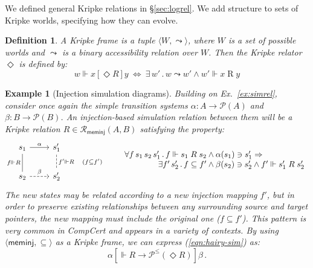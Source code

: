 \documentclass[draft,11pt]{report}
\newtheorem{definition}{Definition}
\newtheorem{example}{Example}
\newcommand{\kw}[1]{\ensuremath{ \mathsf{#1} }}
\newcommand{\ifr}[1]{\mathrel{[{#1}]}}
\begin{document}
We defined general Kripke relations in \S\ref{sec:logrel}.
We add structure to sets of Kripke worlds,
specifying how they can evolve.

\begin{definition} %
A \emph{Kripke frame} is a tuple
$\langle W, {\leadsto} \rangle$, where
$W$ is a set of \emph{possible worlds} and
$\leadsto$ is a
binary \emph{accessibility relation} over $W$.
Then the Kripke relator $\Diamond$ is defined by:
\[
  w \Vdash x \ifr{\Diamond R} y \: \Leftrightarrow \:
    \exists \, w' \,.\, w \leadsto w' \wedge
      w' \Vdash x \mathrel{R} y
\]
\end{definition}

\begin{example}[Injection simulation diagrams] \label{ex:sim} %
Building on Ex.~\ref{ex:simrel},
consider once again the simple transition systems
$\alpha : A \rightarrow \mathcal{P}(A)$ and
$\beta : B \rightarrow \mathcal{P}(B)$.
An injection-based simulation relation between them
will be a Kripke relation
$R \in \mathcal{R}_\kw{meminj}(A, B)$
satisfying the property:
\begin{equation}
    \label{eqn:hairy-sim}
  \begin{tikzcd}[scale=0.8]
    s_1 \arrow[r, "\alpha"]
        \arrow[d, dash, "f \Vdash R"'] &
    s_1' \arrow[d, dashed, dash, "f' \Vdash R \quad (f \subseteq f')"] \\
    s_2 \arrow[r, dashed, "\beta"] &
    s_2'
  \end{tikzcd}
  \qquad
    \begin{array}{r@{}l}
    \forall f \, s_1 \, s_2 \, s_1' \,.\,
      f \Vdash s_1 \mathrel{R} s_2 &{} \wedge
      \alpha(s_1) \ni s_1' \Rightarrow \\
    \exists f' \, s_2' \,.\,
      f \subseteq f' &{} \wedge
      \beta(s_2) \ni s_2' \wedge
      f' \Vdash s_1' \mathrel{R} s_2'
    \end{array}
\end{equation}
The new states may be related according to
a new injection mapping $f'$,
but in order to preserve existing relationships
between any surrounding source and target pointers,
the new mapping must include
the original one ($f \subseteq f'$).
This pattern is very common in CompCert
and appears in a variety of contexts.
By using $\langle \kw{meminj}, {\subseteq} \rangle$
as a Kripke frame,
we can express
(\ref{eqn:hairy-sim}) as:
\[
  \alpha \ifr{\Vdash R \rightarrow \mathcal{P}^\le(\Diamond R)} \beta \,.
\]
\end{example}
\end{document}
